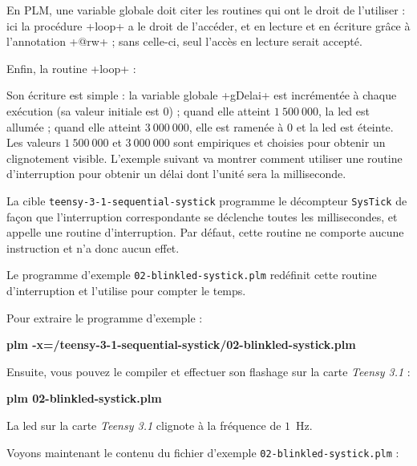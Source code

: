 En PLM, une variable globale doit citer les routines qui ont le droit de l'utiliser : ici la procédure \plm+loop+ a le droit de l'accéder, et en lecture et en écriture grâce à l'annotation \plm+@rw+ ; sans celle-ci, seul l'accès en lecture serait accepté.

Enfin, la routine \plm+loop+ :

Son écriture est simple : la variable globale \plm+gDelai+ est incrémentée à chaque exécution (sa valeur initiale est $0$) ; quand elle atteint $1~500~000$, la led est allumée ; quand elle atteint $3~000~000$, elle est ramenée à $0$ et la led est éteinte. Les valeurs $1~500~000$ et $3~000~000$ sont empiriques et choisies pour obtenir un clignotement visible. L'exemple suivant va montrer comment utiliser une routine d'interruption pour obtenir un délai dont l'unité sera la milliseconde.






La cible \texttt{teensy-3-1-sequential-systick} programme le décompteur \texttt{SysTick} de façon que l'interruption correspondante se déclenche toutes les millisecondes, et appelle une routine d'interruption. Par défaut, cette routine ne comporte aucune instruction et n'a donc aucun effet. 

Le programme d'exemple \texttt{02-blinkled-systick.plm} redéfinit cette routine d'interruption et l'utilise pour compter le temps.

Pour extraire le programme d'exemple :
\begin{SHELL}
\bfseries plm -x=/teensy-3-1-sequential-systick/02-blinkled-systick.plm
\end{SHELL}

Ensuite, vous pouvez le compiler et effectuer son flashage sur la carte \emph{Teensy 3.1} :
\begin{SHELL}
\bfseries plm 02-blinkled-systick.plm
\end{SHELL}

La led sur la carte \emph{Teensy 3.1} clignote à la fréquence de $1$~Hz.

Voyons maintenant le contenu du fichier d'exemple \texttt{02-blinkled-systick.plm} :

